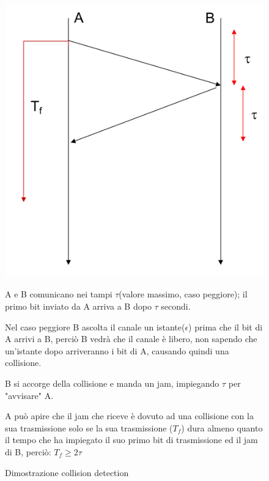 \begin{figure}[htbp]
    \centering
    \begin{minipage}{0.45\textwidth}
        \includegraphics[width=\linewidth]{images/dimostrazionecsma.png}
        \caption{Dimostrazione collision detection}
        \label{fig:dimostrazione-csma}
    \end{minipage}%
    \hfill
    \begin{minipage}{0.5\textwidth}



A e B comunicano nei tampi $\tau$(valore massimo, caso peggiore);
il primo bit inviato da A arriva a B dopo $\tau$ secondi.

Nel caso peggiore B ascolta il canale un istante($\epsilon$) prima che il bit di A arrivi a B, perciò B vedrà che il canale è libero, non sapendo che un'istante dopo arriveranno i bit di A, causando quindi una collisione.

B si accorge della collisione e manda un jam, impiegando $\tau$ per "avvisare" A.

A può apire che il jam che riceve è dovuto ad una collisione con la sua trasmissione solo se la sua trasmissione ($T_f$) dura almeno quanto il tempo che ha impiegato il suo primo bit di trasmissione ed il jam di B, perciò: $T_f  \geq 2\tau$ 


\end{minipage}
\end{figure}
